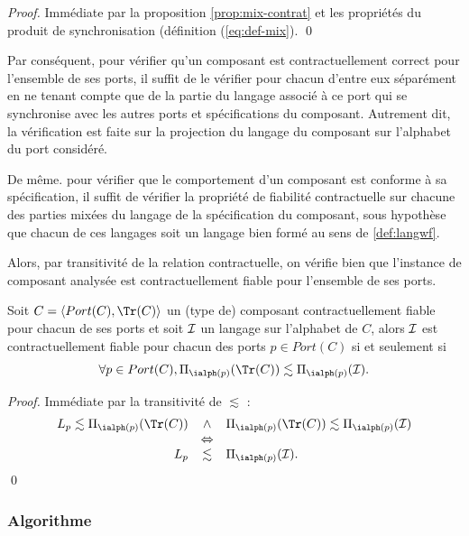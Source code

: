\begin{proof}
    Imm\'ediate par la proposition \ref{prop:mix-contrat} et les
    propri\'et\'es du produit de synchronisation (d\'efinition
    (\ref{eq:def-mix}). \hfill\qed
\end{proof}

Par cons\'equent, pour v\'erifier qu'un
composant est contractuellement correct pour l'ensemble de ses ports,
il suffit de le v\'erifier pour chacun d'entre eux s\'epar\'ement
en ne tenant compte que de la partie du langage associ\'e \`a ce
port qui se synchronise avec les autres ports et sp\'ecifications du
composant. Autrement dit, la v\'erification est faite sur la
projection du langage du composant sur l'alphabet du port
consid\'er\'e. 
 
De m\^eme. pour v\'erifier que le comportement d'un
composant est conforme \`a sa sp\'ecification, il suffit de
v\'erifier la propri\'et\'e de fiabilit\'e contractuelle sur
chacune des parties mix\'ees du langage de la sp\'ecification du
composant, sous hypoth\`ese que chacun de ces langages soit un
langage bien form\'e au sens de \ref{def:langwf}.

Alors, par transitivit\'e de la relation contractuelle, on v\'erifie
bien que l'instance de composant analys\'ee est contractuellement
fiable pour l'ensemble de ses ports. 

\begin{prop}
    Soit $C=\langle Port(C),\Tr(C)\rangle$ un (type de) composant
    contractuellement fiable pour chacun de ses ports et soit $\cal I$ un
    langage sur l'alphabet de $C$, alors $\cal I$ est
    contractuellement fiable pour chacun des ports $p\in Port(C)$ si
    et seulement si
    $$
    \forall p\in Port(C), \Pi_{\ialph(p)}(\Tr(C)) \lesssim \Pi_{\ialph(p)}({\cal I}).
    $$
\end{prop}

\begin{proof}
    Imm\'ediate par la transitivit\'e de $\lesssim$ :
$$    \begin{array}{rcl}
        L_p \lesssim \Pi_{\ialph(p)}(\Tr(C)) &\wedge&
        \Pi_{\ialph(p)}(\Tr(C)) \lesssim \Pi_{\ialph(p)}({\cal I}) \\
        &\Leftrightarrow&\\
        L_p &\lesssim&  \Pi_{\ialph(p)}({\cal I}). \\
\end{array}
$$
\hfill\qed
\end{proof}

\subsubsection{Algorithme}

